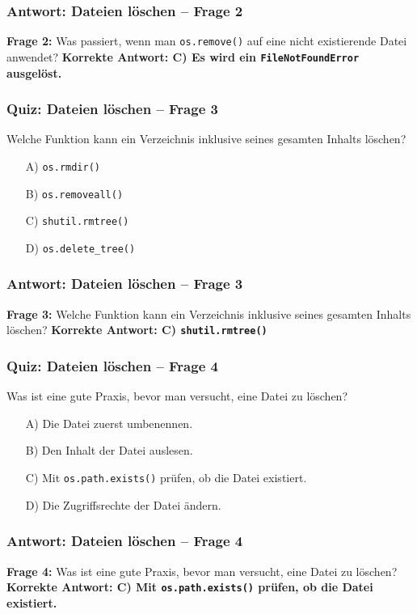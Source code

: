 \documentclass[aspectratio=169]{beamer} %
\begin{document}
\begin{frame}[fragile]
\frametitle{Antwort: Dateien löschen – Frage 2}
\textbf{Frage 2:} Was passiert, wenn man \texttt{os.remove()} auf eine nicht existierende Datei anwendet?
\vspace{1em}
\textbf{Korrekte Antwort: C) Es wird ein \texttt{FileNotFoundError} ausgelöst.}
\end{frame}

\begin{frame}[fragile]
\frametitle{Quiz: Dateien löschen – Frage 3}
Welche Funktion kann ein Verzeichnis inklusive seines gesamten Inhalts löschen?
\begin{enumerate}
    \item[A)] \texttt{os.rmdir()}
    \item[B)] \texttt{os.removeall()}
    \item[C)] \texttt{shutil.rmtree()}
    \item[D)] \texttt{os.delete\_tree()}
\end{enumerate}
\end{frame}

\begin{frame}[fragile]
\frametitle{Antwort: Dateien löschen – Frage 3}
\textbf{Frage 3:} Welche Funktion kann ein Verzeichnis inklusive seines gesamten Inhalts löschen?
\vspace{1em}
\textbf{Korrekte Antwort: C) \texttt{shutil.rmtree()}}
\end{frame}

\begin{frame}[fragile]
\frametitle{Quiz: Dateien löschen – Frage 4}
Was ist eine gute Praxis, bevor man versucht, eine Datei zu löschen?
\begin{enumerate}
    \item[A)] Die Datei zuerst umbenennen.
    \item[B)] Den Inhalt der Datei auslesen.
    \item[C)] Mit \texttt{os.path.exists()} prüfen, ob die Datei existiert.
    \item[D)] Die Zugriffsrechte der Datei ändern.
\end{enumerate}
\end{frame}

\begin{frame}[fragile]
\frametitle{Antwort: Dateien löschen – Frage 4}
\textbf{Frage 4:} Was ist eine gute Praxis, bevor man versucht, eine Datei zu löschen?
\vspace{1em}
\textbf{Korrekte Antwort: C) Mit \texttt{os.path.exists()} prüfen, ob die Datei existiert.}
\end{frame}
\end{document}
